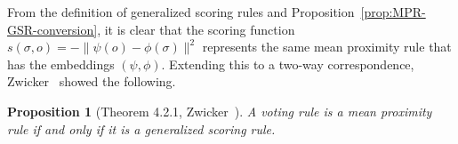 \documentclass[10pt,letterpaper]{article}
\newcommand{\calL}{{\mathcal{L}}}
\newcommand{\rank}{{\calL(A)}}
\newcommand{\calO}{{\mathcal{O}}}
\newtheorem{proposition}{Proposition}
\begin{document}
From the definition of generalized scoring rules and Proposition~\ref{prop:MPR-GSR-conversion}, it is clear that the scoring function $s(\sigma,o) = -\|\psi(o)-\phi(\sigma)\|^2$ represents the same mean proximity rule that has the embeddings $(\psi,\phi)$. Extending this to a two-way correspondence, Zwicker~\cite{Zwicker08a} showed the following. 
\begin{proposition}[Theorem 4.2.1, Zwicker~\cite{Zwicker08a}]
A voting rule is a mean proximity rule if and only if it is a generalized scoring rule.
\label{prop:equiv}
\end{proposition}
%
\end{document}

